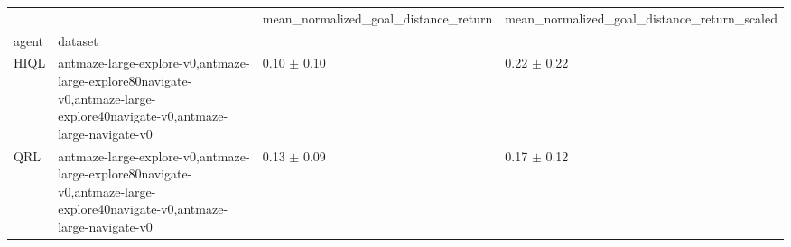 \begin{tabular}{llll}
\toprule
 &  & mean_normalized_goal_distance_return & mean_normalized_goal_distance_return_scaled \\
agent & dataset &  &  \\
\midrule
HIQL & antmaze-large-explore-v0,antmaze-large-explore80navigate-v0,antmaze-large-explore40navigate-v0,antmaze-large-navigate-v0 & 0.10 $\pm$ 0.10 & 0.22 $\pm$ 0.22 \\
\cline{1-4}
QRL & antmaze-large-explore-v0,antmaze-large-explore80navigate-v0,antmaze-large-explore40navigate-v0,antmaze-large-navigate-v0 & 0.13 $\pm$ 0.09 & 0.17 $\pm$ 0.12 \\
\cline{1-4}
\bottomrule
\end{tabular}
